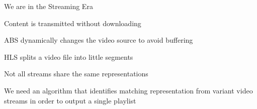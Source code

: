 We are in the Streaming Era

Content is transmitted without downloading

ABS dynamically changes the video source to avoid buffering

HLS splits a video file into little segments 

Not all streams share the same representations

We need an algorithm that identifies matching representation from variant video streams in order to output a single playlist











